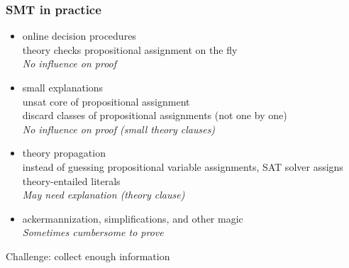 \documentclass[svgnames,table,mathserif]{beamer}
\begin{document}
\begin{frame}
  \frametitle{SMT in practice}

  \begin{itemize}
  \item online decision procedures\\
    {\small theory checks propositional assignment on the fly}\\
    {\it No influence on proof}
  \item small explanations\\
    {\small unsat core of propositional assignment\\
    discard classes of propositional assignments (not one by one)}\\
    {\it No influence on proof \small (small theory clauses)}
  \item theory propagation\\
    {\small instead of guessing propositional variable
    assignments, SAT solver assigns theory-entailed literals}\\
    {\it May need explanation (theory clause)}
  \item ackermannization, simplifications, and other magic\\
    {\it Sometimes cumbersome to prove}
  \end{itemize}

  \begin{block}{}
    Challenge: collect enough information
  \end{block}

\end{frame}

\end{document}
